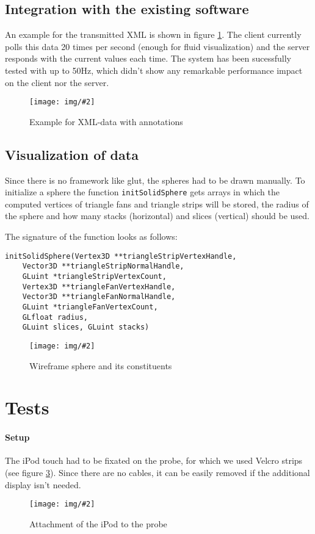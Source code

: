 \documentclass{scrartcl}
\newcommand{\graphic}[3][width=\linewidth] %
{
  \begin{figure}[h!t]
    \centering
    \texttt{[image: img/\#2]}
    \caption{#3}
    \label{fig:#2}
  \end{figure}
}
\newcommand{\refFigure}[1]{figure \ref{fig:#1}}
\begin{document}
\subsection{Integration with the existing software}
An example for the transmitted XML is shown in \refFigure{data}. The client currently polls this data 20 times per second (enough for fluid visualization) and the server responds with the current values each time. The system has been sucessfully tested with up to 50Hz, which didn't show any remarkable performance impact on the client nor the server.
\graphic[scale=.5]{data}{Example for XML-data with annotations}

\subsection{Visualization of data}
Since there is no framework like glut, the spheres had to be drawn manually. To initialize a sphere the function \verb|initSolidSphere| gets arrays in which the computed vertices of triangle fans and triangle strips will be stored, the radius of the sphere and how many stacks (horizontal) and slices (vertical) should be used.

The signature of the function looks as follows:
\begin{verbatim}
initSolidSphere(Vertex3D **triangleStripVertexHandle,
    Vector3D **triangleStripNormalHandle,
    GLuint *triangleStripVertexCount,
    Vertex3D **triangleFanVertexHandle,
    Vector3D **triangleFanNormalHandle,
    GLuint *triangleFanVertexCount,
    GLfloat radius,
    GLuint slices, GLuint stacks)
\end{verbatim}
\graphic[scale=.5]{sphere}{Wireframe sphere and its constituents}



\section{Tests}
\paragraph*{Setup}
The iPod touch had to be fixated on the probe, for which we used Velcro strips (see \refFigure{probe}). Since there are no cables, it can be easily removed if the additional display isn't needed.
\graphic[scale=.5]{probe}{Attachment of the iPod to the probe}
\end{document}
